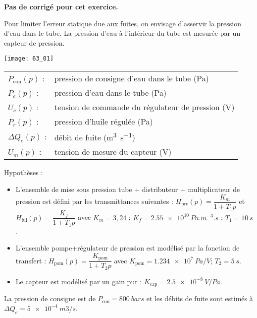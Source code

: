 \normaltrue \difficilefalse \tdifficilefalse
\correctiontrue

\setcounter{numques}{0}

\ifcorrection
\else
\textbf{Pas de corrigé pour cet exercice.}
\fi

\ifprof
\else 

Pour limiter l’erreur statique due aux fuites, on envisage d’asservir la pression d’eau dans le tube. 
La pression d’eau à l’intérieur du tube est mesurée par un capteur de pression. 

\begin{center}
\texttt{[image: 63\_01]}
\end{center}

 
 \begin{tabular}{lp{5cm}}
$P_{\text{con}}(p)$ : & 	pression de consigne d’eau dans le tube (Pa) \\
$P_e(p)$ : & 	pression d’eau dans le tube (Pa) \\
$U_c(p)$ : & 	tension de commande du régulateur de pression (V)\\
$P_r(p)$ : &	pression d’huile régulée (Pa)\\
$\Delta Q_e(p)$ :& 	débit de fuite (\si{m^3s^{-1}})\\
$U_m(p)$ 	:&	tension de mesure du capteur (V)\\
\end{tabular}
 
 Hypothèses :
\begin{itemize}
\item L’ensemble de mise sous pression {tube + distributeur + multiplicateur de pression} est défini par les transmittances suivantes : $H_{\text{pre}} (p)=\dfrac{K_m}{1+T_1 p}$	et	$H_{\text{fui}} (p)=\dfrac{K_f}{1+T_1 p}$ avec 	$K_m = 3,24$ ; 	$K_f = \SI{2,55e10}{Pa.m^{-3}.s}$ ; 	$T_1  = \SI{10}{s}$.
\item L’ensemble {pompe+régulateur de pression} est modélisé par la fonction de transfert :
$H_{\text{pom}} (p)=\dfrac{K_{\text{pom}}}{1+T_2 p}$  avec 	$K_{\text{pom}} = \SI{1,234e7}{Pa/V}$; 	$T_2 = \SI{5}{s}$.
\item Le capteur est modélisé par un gain pur :	$K_{\text{cap}} = \SI{2,5e-8}{V/Pa}$.
\end{itemize}
La pression de consigne est de $P_{\text{con}} = \SI{800}{bars}$ et les débits de fuite sont estimés à $\Delta Q_e = \SI{5e-4}{m3/s}$.


